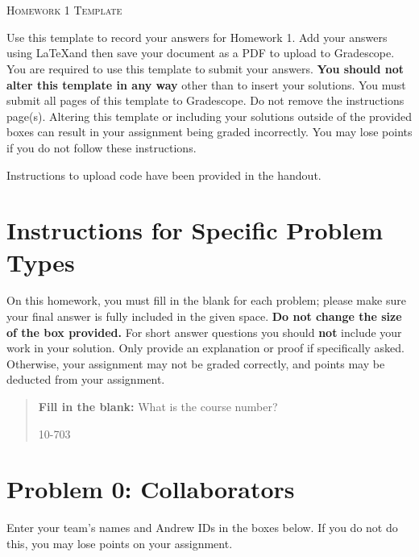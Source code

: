 \documentclass[12pt]{article}
\begin{document}
\section*{}
\begin{center}
  \centerline{\textsc{\LARGE  Homework 1 Template}}
\end{center}

Use this template to record your answers for Homework 1.  Add your answers using \LaTeX and then save your document as a PDF to upload to Gradescope.  You are required to use this template to submit your answers.  \textbf{You should not alter this template in any way} other than to insert your solutions.  You must submit all \pageref{LastPage} pages of this template to Gradescope.  Do not remove the instructions page(s).  Altering this template or including your solutions outside of the provided boxes can result in your assignment being graded incorrectly.  You may lose points if you do not follow these instructions.

Instructions to upload code have been provided in the handout.

\section*{Instructions for Specific Problem Types}

On this homework, you must fill in the blank for each problem; please make sure your final answer is fully included in the given space.  \textbf{Do not change the size of the box provided.}  For short answer questions you should \textbf{not} include your work in your solution.  Only provide an explanation or proof if specifically asked.  Otherwise, your assignment may not be graded correctly, and points may be deducted from your assignment.

\begin{quote}
\textbf{Fill in the blank:} What is the course number?

\begin{tcolorbox}[fit,height=1cm, width=4cm, blank, borderline={1pt}{-2pt},valign=center,nobeforeafter]
    \begin{center}\huge10-703\end{center}
    \end{tcolorbox}
\end{quote}

\newpage

\section*{Problem 0: Collaborators}
Enter your team's names and Andrew IDs in the boxes below.  If you do not do this, you may lose points on your assignment.
\end{document}
